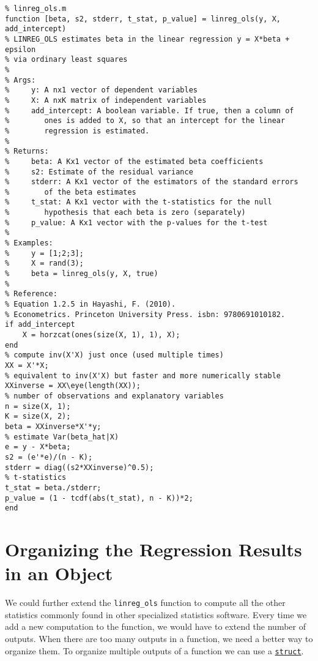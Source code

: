 \documentclass[12pt, a4paper]{article}
\begin{document}
\begin{lstlisting}
% linreg_ols.m
function [beta, s2, stderr, t_stat, p_value] = linreg_ols(y, X, add_intercept)
% LINREG_OLS estimates beta in the linear regression y = X*beta + epsilon
% via ordinary least squares
%
% Args:
%     y: A nx1 vector of dependent variables
%     X: A nxK matrix of independent variables
%     add_intercept: A boolean variable. If true, then a column of
%        ones is added to X, so that an intercept for the linear
%        regression is estimated.
%
% Returns:
%     beta: A Kx1 vector of the estimated beta coefficients
%     s2: Estimate of the residual variance
%     stderr: A Kx1 vector of the estimators of the standard errors
%        of the beta estimates
%     t_stat: A Kx1 vector with the t-statistics for the null
%        hypothesis that each beta is zero (separately)
%     p_value: A Kx1 vector with the p-values for the t-test
%
% Examples:
%     y = [1;2;3];
%     X = rand(3);
%     beta = linreg_ols(y, X, true)
%
% Reference:
% Equation 1.2.5 in Hayashi, F. (2010).
% Econometrics. Princeton University Press. isbn: 9780691010182.
if add_intercept
    X = horzcat(ones(size(X, 1), 1), X);
end
% compute inv(X'X) just once (used multiple times)
XX = X'*X;
% equivalent to inv(X'X) but faster and more numerically stable
XXinverse = XX\eye(length(XX));
% number of observations and explanatory variables
n = size(X, 1);
K = size(X, 2);
beta = XXinverse*X'*y;
% estimate Var(beta_hat|X)
e = y - X*beta;
s2 = (e'*e)/(n - K);
stderr = diag((s2*XXinverse)^0.5);
% t-statistics
t_stat = beta./stderr;
p_value = (1 - tcdf(abs(t_stat), n - K))*2;
end
\end{lstlisting}
\section{Organizing the Regression Results in an Object}
\label{sec:orgd585d39}
We could further extend the \texttt{linreg\_ols} function to compute all the other statistics commonly found in other specialized statistics software.
Every time we add a new computation to the function, we would have to extend the number of outputs.
When there are too many outputs in a function, we need a better way to organize them.
To organize multiple outputs of a function we can use a \href{https://www.mathworks.com/help/matlab/ref/struct.html}{\texttt{struct}}.
\end{document}
